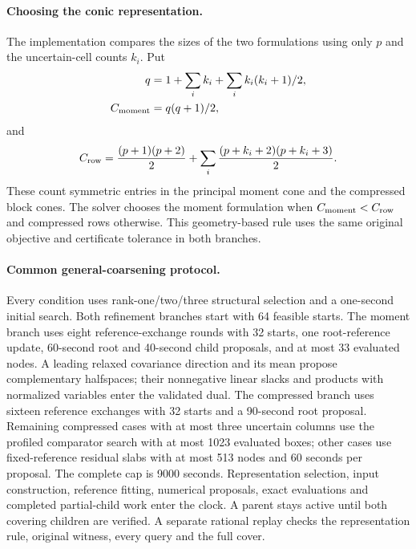\paragraph{Choosing the conic representation.}
The implementation compares the sizes of the two formulations using only $p$ and the uncertain-cell counts $k_i$. Put
\[
 \begin{aligned}
 q&=1+\sum_i k_i+\sum_i k_i(k_i+1)/2,\\
 C_{\rm moment}&=q(q+1)/2,
 \end{aligned}
\]
and
\[
 C_{\rm row}=\frac{(p+1)(p+2)}2+
 \sum_i\frac{(p+k_i+2)(p+k_i+3)}2.
\]
These count symmetric entries in the principal moment cone and the compressed block cones. The solver chooses the moment formulation when $C_{\rm moment}<C_{\rm row}$ and compressed rows otherwise. This geometry-based rule uses the same original objective and certificate tolerance in both branches.

\paragraph{Common general-coarsening protocol.}
Every condition uses rank-one/two/three structural selection and a one-second initial search. Both refinement branches start with 64 feasible starts. The moment branch uses eight reference-exchange rounds with 32 starts, one root-reference update, 60-second root and 40-second child proposals, and at most 33 evaluated nodes. A leading relaxed covariance direction and its mean propose complementary halfspaces; their nonnegative linear slacks and products with normalized variables enter the validated dual. The compressed branch uses sixteen reference exchanges with 32 starts and a 90-second root proposal. Remaining compressed cases with at most three uncertain columns use the profiled comparator search with at most 1023 evaluated boxes; other cases use fixed-reference residual slabs with at most 513 nodes and 60 seconds per proposal. The complete cap is 9000 seconds. Representation selection, input construction, reference fitting, numerical proposals, exact evaluations and completed partial-child work enter the clock. A parent stays active until both covering children are verified. A separate rational replay checks the representation rule, original witness, every query and the full cover.
